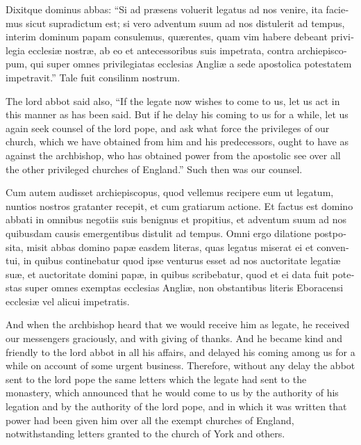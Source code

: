 \documentclass[10pt]{book}
\begin{document}
\begin{paracol}{2}
\switchcolumn*

\begin{otherlanguage}{latin}
Dixitque dominus abbas: ``Si ad pr\ae{}sens voluerit legatus ad nos venire, ita faciemus sicut supradictum est; si vero adventum suum ad nos distulerit ad tempus, interim dominum papam consulemus, qu\ae{}rentes, quam vim habere debeant privilegia ecclesi\ae{} nostr\ae{}, ab eo et antecessoribus suis impetrata, contra archiepiscopum, qui super omnes privilegiatas ecclesias Angli\ae{} a sede apostolica potestatem impetravit.'' Tale fuit consilinm nostrum.
\end{otherlanguage}

\switchcolumn

The lord abbot said also, ``If the legate now wishes to come to us, let us act in this manner as has been said. But if he delay his coming to us for a while, let us again seek counsel of the lord pope, and ask what force the privileges of our church, which we have obtained from him and his predecessors, ought to have as against the archbishop, who has obtained power from the apostolic see over all the other privileged churches of England.'' Such then was our counsel.

\switchcolumn*

\begin{otherlanguage}{latin}
Cum autem audisset archiepiscopus, quod vellemus recipere eum ut legatum, nuntios nostros gratanter recepit, et cum gratiarum actione. Et factus est domino abbati in omnibus negotiis suis benignus et propitius, et adventum suum ad nos quibusdam causis emergentibus distulit ad tempus. Omni ergo dilatione postposita, misit abbas domino pap\ae{} easdem literas, quas legatus miserat ei et conventui, in quibus continebatur quod ipse venturus esset ad nos auctoritate legati\ae{} su\ae{}, et auctoritate domini pap\ae{}, in quibus scribebatur, quod et ei data fuit potestas super omnes exemptas ecclesias Angli\ae{}, non obstantibus literis Eboracensi ecclesi\ae{} vel alicui impetratis. 
\end{otherlanguage}

\switchcolumn

And when the archbishop heard that we would receive him as legate, he received our messengers graciously, and with giving of thanks. And he became kind and friendly to the lord abbot in all his affairs, and delayed his coming among us for a while on account of some urgent business. Therefore, without any delay the abbot sent to the lord pope the same letters which the legate had sent to the monastery, which announced that he would come to us by the authority of his legation and by the authority of the lord pope, and in which it was written that power had been given him over all the exempt churches of England, notwithstanding letters granted to the church of York and others.


\end{paracol}
\end{document}
